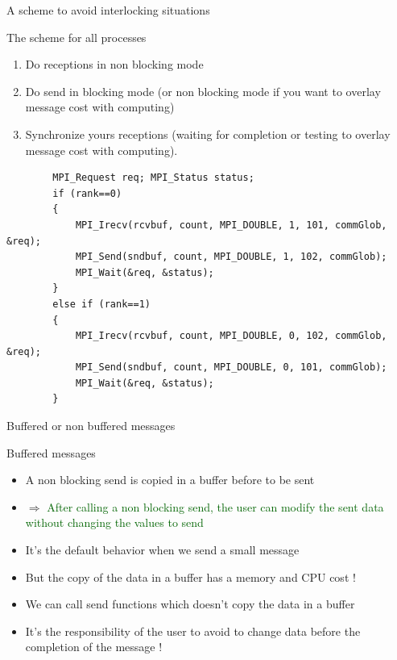 \documentclass[compress,10pt,aspectratio=169]{beamer}
\begin{document}
\begin{frame}[fragile]{A scheme to avoid interlocking situations}
    \scriptsize
    \begin{block}{The scheme for all processes}
        \begin{enumerate}
        \item Do receptions in non blocking mode
        \item Do send in blocking mode (or non blocking mode if you want to overlay message cost with computing)
        \item Synchronize yours receptions (waiting for completion or testing to overlay message cost with computing).
        \end{enumerate}
    \end{block}
    \begin{verbatim}
        MPI_Request req; MPI_Status status;
        if (rank==0)
        {
            MPI_Irecv(rcvbuf, count, MPI_DOUBLE, 1, 101, commGlob, &req);
            MPI_Send(sndbuf, count, MPI_DOUBLE, 1, 102, commGlob);
            MPI_Wait(&req, &status);
        }
        else if (rank==1)
        {
            MPI_Irecv(rcvbuf, count, MPI_DOUBLE, 0, 102, commGlob, &req);
            MPI_Send(sndbuf, count, MPI_DOUBLE, 0, 101, commGlob);
            MPI_Wait(&req, &status);
        }
        \end{verbatim}
\end{frame}


\begin{frame}[fragile]{Buffered or non buffered messages}

    \begin{block}{Buffered messages}
        \begin{itemize}
            \item A non blocking send is copied in a buffer before to be sent
            \item $\Rightarrow$ \textcolor{DarkGreen}{After calling a non blocking send, the user can modify the sent data without
                  changing the values to send}
            \item It's the default behavior when we send a small message
            \item But the copy of the data in a buffer has a memory and CPU cost !
            \item We can call send functions which doesn't copy the data in a buffer
            \item \alert{It's the responsibility of the user to avoid to change data before the completion of the message !}
        \end{itemize}
    \end{block}
\end{frame}
\end{document}
